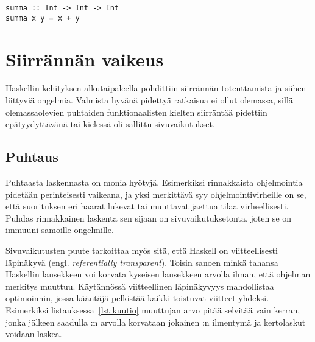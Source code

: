 \documentclass[finnish]{tktltiki2}
\begin{document}
\begin{lstlisting}[float,label={lst:esittely},caption={Syntaksin esittely}]
summa :: Int -> Int -> Int
summa x y = x + y
\end{lstlisting}


\section{Siirrännän vaikeus}



Haskellin kehityksen alkutaipaleella pohdittiin siirrännän toteuttamista ja siihen liittyviä
ongelmia. Valmista hyvänä pidettyä ratkaisua ei ollut olemassa, sillä olemassaolevien puhtaiden
funktionaalisten kielten siirräntää pidettiin epätyydyttävänä tai kielessä oli sallittu
sivuvaikutukset.

\subsection{Puhtaus}

Puhtaasta laskennasta on monia hyötyjä.  Esimerkiksi rinnakkaista
ohjelmointia pidetään perinteisesti vaikeana, ja yksi merkittävä syy ohjelmointivirheille on se,
että suorituksen eri haarat lukevat tai muuttavat jaettua tilaa virheellisesti. Puhdas rinnakkainen
laskenta sen sijaan on sivuvaikutuksetonta, joten se on immuuni samoille ongelmille.


Sivuvaikutusten puute tarkoittaa myös sitä, että Haskell on viitteellisesti läpinäkyvä (engl.
\emph{referentially transparent}). Toisin sanoen minkä tahansa Haskellin lausekkeen voi korvata
kyseisen lausekkeen arvolla ilman, että ohjelman merkitys muuttuu. Käytännössä viitteellinen
läpinäkyvyys mahdollistaa optimoinnin, jossa kääntäjä pelkistää kaikki toistuvat viitteet yhdeksi.
Esimerkiksi listauksessa~\ref{lst:kuutio} muuttujan  arvo pitää selvitää vain kerran, jonka
jälkeen saadulla :n arvolla korvataan jokainen :n ilmentymä ja kertolaskut voidaan
laskea.
\end{document}
